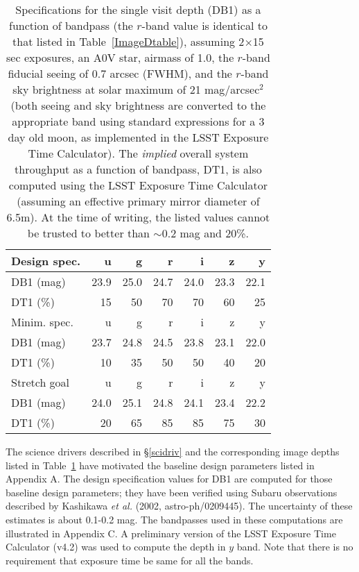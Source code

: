 \begin{table}[h]
\begin{tabular}{|l|r|r|r|r|r|r|}
\hline
 Design spec.  &       u   &     g    &      r     &   i   &   z   &  y   \\
\hline
 DB1 (mag)  &    23.9   &    25.0  &     24.7   &  24.0 &  23.3 & 22.1 \\
\hline
 DT1 (\%)   &     15    &     50   &      70    &   70  &   60  &  25  \\
\hline
\hline
 Minim. spec.  &       u   &     g    &      r     &   i   &   z   &  y   \\
\hline
 DB1 (mag)  &    23.7   &    24.8  &     24.5   &  23.8 &  23.1 & 22.0 \\
\hline
 DT1 (\%)   &     10    &     35   &      50    &   50  &   40  &  20  \\
\hline
\hline
 Stretch goal  &       u   &     g    &      r     &   i   &   z   &  y   \\
\hline
 DB1 (mag)     &    24.0   &    25.1  &     24.8   &  24.1 &  23.4 & 22.2 \\
\hline
 DT1 (\%)      &     20    &     65   &     85     &   85  &   75  &  30  \\
\hline
\end{tabular}
\caption{Specifications for the single visit depth (DB1) as a function
of bandpass (the $r$-band value is identical to that listed in
Table~\ref{ImageDtable}), assuming 2$\times$15 sec exposures, an A0V star,
airmass of 1.0, the $r$-band fiducial seeing of 0.7 arcsec (FWHM), and
the $r$-band sky brightness at solar maximum of 21 mag/arcsec$^2$ (both seeing
and sky brightness are converted to the appropriate band using standard
expressions for a 3 day old moon, as implemented in the LSST Exposure Time
Calculator). The {\it implied} overall system throughput as a function of
bandpass, DT1, is also computed using the LSST Exposure Time Calculator
(assuming an effective primary mirror diameter of 6.5m). At the time of
writing, the listed values cannot be trusted to better than $\sim$0.2 mag
and 20\%.}
\label{ImageDBtable}
\end{table}

The science drivers described in \S \ref{scidriv} and
the corresponding image depths listed in Table~\ref{ImageDBtable}
have motivated the baseline design
parameters listed in Appendix A. The design specification values for
DB1 are computed for those baseline design parameters; they have
been verified using Subaru observations described by Kashikawa {\it et al.}
(2002, astro-ph/0209445). The uncertainty of these estimates is about
0.1-0.2 mag. The bandpasses used in these computations are illustrated in
Appendix C. A preliminary version of the LSST Exposure Time Calculator
(v4.2) was used to compute the depth in $y$ band. Note that there is no
requirement that exposure time be same for all the bands.

